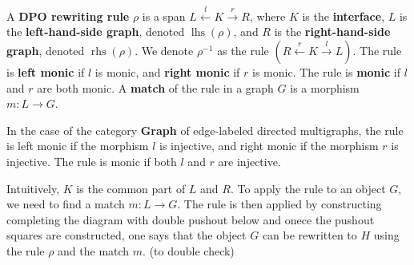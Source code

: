 \begin{definition}
  \label{def:grs:dpo_rule}
A \textbf{DPO rewriting rule} $\rho$ is a span \( L \overset{l}{\leftarrow} K \overset{r}{\rightarrow} R \), where \( K \) is the \textbf{interface}, \( L \) is the \textbf{left-hand-side graph}, denoted \( \operatorname{lhs}(\rho) \), and \( R \) is the \textbf{right-hand-side graph}, denoted \( \operatorname{rhs}(\rho) \). We denote $\rho^{-1}$ as the rule $(R \overset{r}{\leftarrow} K \overset{l}{\rightarrow} L)$. The rule is \textbf{left monic} if \( l \) is monic, and \textbf{right monic} if \( r \) is monic. 
The rule is \textbf{monic} if $l$ and $r$ are both monic.
A \textbf{match} of the rule in a graph \( G \) is a morphism \( m: L \rightarrow G \).
\end{definition}
In the case of the category \textbf{Graph} of edge-labeled directed multigraphs, the rule is left monic if the morphism \( l \) is injective, and right monic if the morphism \( r \) is injective. The rule is monic if both \( l \) and \( r \) are injective.

Intuitively, $K$ is the common part of $L$ and $R$. To apply the rule to an object $G$, we need to find a match $m:L \to G$. The rule is then applied by constructing completing the diagram with double pushout below and onece the pushout squares are constructed, one says that the object $G$ can be rewritten to $H$ using the rule $\rho$ and the match $m$. (to double check)
\begin{center}
\end{center}

